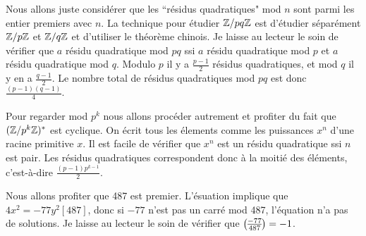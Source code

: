 \begin{sol}
Nous allons juste consid\'erer que les ``r\'esidus quadratiques" mod $n$ sont parmi les entier premiers avec $n$. La technique pour \'etudier $\mathbb Z/pq\mathbb Z$ est d'\'etudier s\'epar\'ement $\mathbb Z/p\mathbb Z$ et $\mathbb Z/q\mathbb Z$ et d'utiliser le th\'eor\`eme chinois. Je laisse au lecteur le soin de v\'erifier que $a$ r\'esidu quadratique mod $pq$ ssi $a$ r\'esidu quadratique mod $p$ et $a$ r\'esidu quadratique mod $q$. Modulo $p$ il y a $\frac{p-1}{2}$ r\'esidus quadratiques, et mod $q$ il y en a $\frac{q-1}{2}$. Le nombre total de r\'esidus quadratiques mod $pq$ est donc $\frac{(p-1)(q-1)}{4}$.

Pour regarder mod $p^k$ nous allons proc\'eder autrement et profiter du fait que $(\mathbb Z/p^k\mathbb Z)^\ast$ est cyclique. On \'ecrit tous les \'elements comme les puissances $x^n$ d'une racine primitive $x$. Il est facile de v\'erifier que $x^n$ est un r\'esidu quadratique ssi $n$ est pair. Les r\'esidus quadratiques correspondent donc \`a la moiti\'e des \'el\'ements, c'est-\`a-dire $\frac{(p-1)p^{k-1}}{2}$.
\end{sol}

\begin{sol}
Nous allons profiter que 487 est premier. L'\'esuation implique que $4x^2= -77y^2[487]$, donc si $-77$ n'est pas un carr\'e mod 487, l'\'equation n'a pas de solutions. Je laisse au lecteur le soin de v\'erifier que ${-77\overwithdelims () 487}=-1$.
\end{sol}